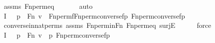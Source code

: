 \begin{isabellebody}
\ assms\ Fn{\isacharunderscore}{\kern0pt}perm{\isacharprime}{\kern0pt}{\isacharunderscore}{\kern0pt}eq\ \isanewline
\ \ \ \ \isamarkupfalse%
\ auto\isanewline
\ \ \isamarkupfalse%
\ I{}{\isacharcolon}{\kern0pt}\ {\isachardoublequoteopen}{\isachardot}{\kern0pt}{\isachardot}{\kern0pt}{\isachardot}{\kern0pt}\ {\isasymlongleftrightarrow}\ {\isacharparenleft}{\kern0pt}{\isasymexists}p{\isacharprime}{\kern0pt}\ {\isasymin}\ Fn{\isachardot}{\kern0pt}\ v\ {\isacharequal}{\kern0pt}\ {\isacharless}{\kern0pt}Fn{\isacharunderscore}{\kern0pt}perm{\isacharprime}{\kern0pt}{\isacharparenleft}{\kern0pt}f{\isacharparenright}{\kern0pt}{\isacharbackquote}{\kern0pt}{\isacharparenleft}{\kern0pt}Fn{\isacharunderscore}{\kern0pt}perm{\isacharprime}{\kern0pt}{\isacharparenleft}{\kern0pt}converse{\isacharparenleft}{\kern0pt}f{\isacharparenright}{\kern0pt}{\isacharparenright}{\kern0pt}{\isacharbackquote}{\kern0pt}p{\isacharprime}{\kern0pt}{\isacharparenright}{\kern0pt}{\isacharcomma}{\kern0pt}\ Fn{\isacharunderscore}{\kern0pt}perm{\isacharprime}{\kern0pt}{\isacharparenleft}{\kern0pt}converse{\isacharparenleft}{\kern0pt}f{\isacharparenright}{\kern0pt}{\isacharparenright}{\kern0pt}{\isacharbackquote}{\kern0pt}p{\isacharprime}{\kern0pt}{\isachargreater}{\kern0pt}{\isacharparenright}{\kern0pt}{\isachardoublequoteclose}\isanewline
\ \ \ \ \isamarkupfalse%
\ converse{\isacharunderscore}{\kern0pt}in{\isacharunderscore}{\kern0pt}nat{\isacharunderscore}{\kern0pt}perms\ assms\ Fn{\isacharunderscore}{\kern0pt}perm{\isacharunderscore}{\kern0pt}in{\isacharunderscore}{\kern0pt}Fn\ Fn{\isacharunderscore}{\kern0pt}perm{\isacharprime}{\kern0pt}{\isacharunderscore}{\kern0pt}eq\ surjE\isanewline
\ \ \ \ \isamarkupfalse%
\ force\isanewline
\ \ \isamarkupfalse%
\ I{}{\isacharcolon}{\kern0pt}\ {\isachardoublequoteopen}{\isachardot}{\kern0pt}{\isachardot}{\kern0pt}{\isachardot}{\kern0pt}\ {\isasymlongleftrightarrow}\ {\isacharparenleft}{\kern0pt}{\isasymexists}p{\isacharprime}{\kern0pt}\ {\isasymin}\ Fn{\isachardot}{\kern0pt}\ v\ {\isacharequal}{\kern0pt}\ {\isacharless}{\kern0pt}p{\isacharprime}{\kern0pt}{\isacharcomma}{\kern0pt}\ Fn{\isacharunderscore}{\kern0pt}perm{\isacharprime}{\kern0pt}{\isacharparenleft}{\kern0pt}converse{\isacharparenleft}{\kern0pt}f{\isacharparenright}{\kern0pt}{\isacharparenright}{\kern0pt}{\isacharbackquote}{\kern0pt}p{\isacharprime}{\kern0pt}{\isachargreater}{\kern0pt}{\isacharparenright}{\kern0pt}{\isachardoublequoteclose}\isanewline
\ \ \ \ \isamarkupfalse%

\end{isabellebody}
